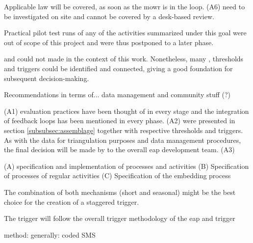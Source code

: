 


Applicable law will be covered, as soon as the \acrshort{mowr} is in the loop. (A6) need to be investigated on site and cannot be covered by a desk-based review.


Practical pilot test runs of any of the activities summarized under this goal were out of scope of this project and were thus postponed to a later phase. 


and could not made in the context of this work. Nonetheless, many , thresholds and triggers could be identified and connected, giving a good foundation for subsequent decision-making. 

Recommendations in terms of... data management and community stuff (?)

(A1) evaluation practices have been thought of in every stage and the integration of feedback loops has been mentioned in every phase. (A2)  were presented in section \ref*{subsubsec:assemblage} together with respective thresholds and triggers. As with the data for triangulation purposes and data management procedures, the final decision will be made by to the overall \acrshort{eap} development team. (A3)

(A) specification and implementation of processes and activities
(B) Specification of processes of regular activities
(C) Specification of the embedding process

The combination of both mechanisms (short and seasonal) might be the best choice for the creation of a staggered trigger.

The trigger will follow the overall trigger methodology of the \acrshort{eap} and 
trigger

method: generally: coded SMS

